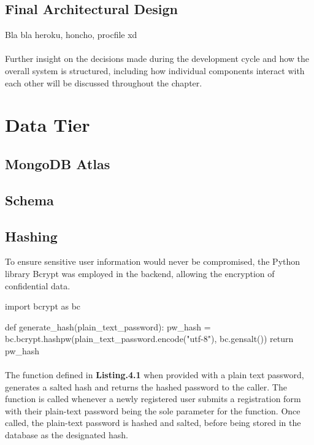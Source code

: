 \subsection{Final Architectural Design}
Bla bla heroku, honcho, procfile xd

\paragraph{}
Further insight on the decisions made during the development cycle and how the overall system is structured, including how individual components interact with each other will be discussed throughout the chapter.

\section{Data Tier}
\subsection{MongoDB Atlas}
\subsection{Schema}
\subsection{Hashing}
To ensure sensitive user information would never be compromised, the Python library Bcrypt was employed in the backend, allowing the encryption of confidential data. \newline

\begin{python}[caption=Hashing a Password with Bcrypt]
import bcrypt as bc

def generate_hash(plain_text_password):
    pw_hash = bc.bcrypt.hashpw(plain_text_password.encode("utf-8"), bc.gensalt())
    return pw_hash
\end{python}

\paragraph{}
The function defined in \textbf{Listing.4.1} when provided with a plain text password, generates a salted hash and returns the hashed password to the caller. The function is called whenever a newly registered user submits a registration form with their plain-text password being the sole parameter for the function. Once called, the plain-text password is hashed and salted, before being stored in the database as the designated hash. \newline

